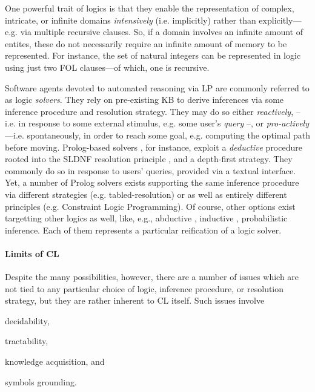 \documentclass[12pt,a4paper,openright,twoside]{book}
\begin{document}
One powerful trait of logics is that they enable the representation of complex, intricate, or infinite domains \emph{intensively} (i.e. implicitly) rather than explicitly---e.g. via multiple recursive clauses.
%
So, if a domain involves an infinite amount of entites, these do not necessarily require an infinite amount of memory to be represented.
%
For instance, the set of natural integers can be represented in logic using just two FOL clauses---of which, one is recursive.

Software agents devoted to automated reasoning via LP are commonly referred to as logic \emph{solvers}.
%
They rely on pre-existing KB to derive inferences via some inference procedure and resolution strategy.
%
They may do so either \emph{reactively}, -- i.e. in response to some external stimulus, e.g. some user's \emph{query} --, or \emph{pro-actively}---i.e. spontaneously, in order to reach some goal, e.g. computing the optimal path before moving.
%
Prolog-based solvers \cite{ColmerauerR93,colmerauer1986-theoreticalProlog}, for instance, exploit a \emph{deductive} procedure rooted into the SLDNF resolution principle \cite{Kowalski1974, Clark77}, and a depth-first strategy.
%
They commonly do so in response to users' queries, provided via a textual interface.
%
Yet, a number of Prolog solvers exists supporting the same inference procedure via different strategies (e.g. tabled-resolution\missingref) or as well as entirely different principles (e.g. Constraint Logic Programming).
%
Of course, other options exist targetting other logics as well, like, e.g., abductive \cite{FungIff97}, inductive \cite{Muggleton94}, probabilistic \cite{RaedtK15} inference.
%
Each of them represents a particular reification of a logic solver.

\paragraph{Limits of CL}

Despite the many possibilities, however, there are a number of issues which are not tied to any particular choice of logic, inference procedure, or resolution strategy, but they are rather inherent to CL itself.
%
Such issues involve
%
\begin{inlinelist}
    \item decidability,
    \item tractability,
    \item knowledge acquisition, and
    \item symbols grounding.
\end{inlinelist}
\end{document}
